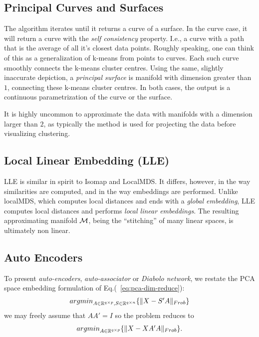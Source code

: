 \documentclass[12pt,a4paper]{article}
\begin{document}
\subsection{Principal Curves and Surfaces}


The algorithm iterates until it returns a curve of a surface.
In the curve case, it will return a curve with the \emph{self consistency} property. 
I.e., a curve with a path that is the average of all it's closest data points.
Roughly speaking, one can think of this as a generalization of k-means from points to curves. 
Each such curve smoothly connects the k-means cluster centres.
Using the same, slightly inaccurate depiction, a \emph{principal surface} is manifold with dimension greater than $1$, connecting these k-means cluster centres.
In both cases, the output is a continuous parametrization of the curve or the surface.

It is highly uncommon to approximate the data with manifolds with a dimension larger than $2$, as typically the method is used for projecting the data before visualizing \andor clustering.






\subsection{Local Linear Embedding (LLE)}
\label{sec:lle}

LLE is similar in spirit to Isomap and LocalMDS.
It differs, however, in the way similarities are computed, and in the way embeddings are performed. 
Unlike localMDS, which computes local distances and ends with a \emph{global embedding}, LLE computes local distances and performs \emph{local linear embeddings}.
The resulting approximating manifold $\mathcal{M}$, being the ``stitching'' of many linear spaces, is ultimately non linear.




\subsection{Auto Encoders}
\label{sec:auto_encoders}

To present \emph{auto-encoders}, \aka \emph{auto-associator} or \emph{Diabolo network}, we restate the PCA space embedding formulation of Eq.(~\ref{eq:pca-dim-reduce}):
\begin{align}
	\textstyle{\mathop{argmin}_{A\in \mathbb{R}^{q \times p}, S\in \mathbb{R}^{q \times n}}}\{ \Vert X- S'A \Vert_{Frob} \}
\end{align}
we may freely assume that $AA'=I$ so the problem reduces to
\begin{align}
	\textstyle{\mathop{argmin}_{A\in \mathbb{R}^{q \times p}}}\{ \Vert X- XA'A \Vert_{Frob} \}.
\end{align}
\end{document}

